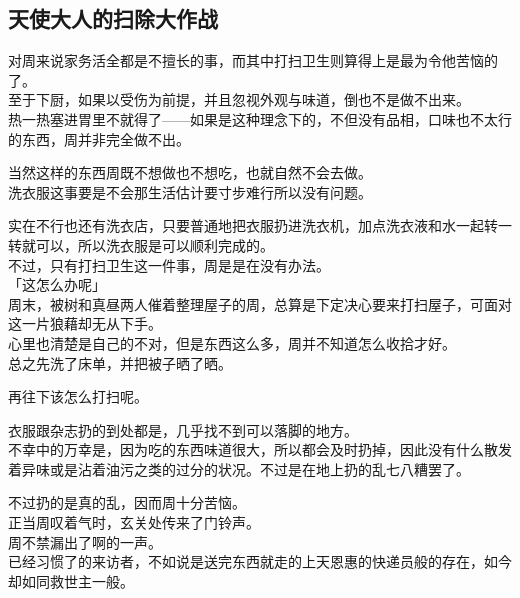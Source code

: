 \subsection{天使大人的扫除大作战}

对周来说家务活全都是不擅长的事，而其中打扫卫生则算得上是最为令他苦恼的了。\\

至于下厨，如果以受伤为前提，并且忽视外观与味道，倒也不是做不出来。\\

热一热塞进胃里不就得了——如果是这种理念下的，不但没有品相，口味也不太行的东西，周并非完全做不出。

当然这样的东西周既不想做也不想吃，也就自然不会去做。\\

洗衣服这事要是不会那生活估计要寸步难行所以没有问题。

实在不行也还有洗衣店，只要普通地把衣服扔进洗衣机，加点洗衣液和水一起转一转就可以，所以洗衣服是可以顺利完成的。\\

不过，只有打扫卫生这一件事，周是是在没有办法。\\

「这怎么办呢」\\

周末，被树和真昼两人催着整理屋子的周，总算是下定决心要来打扫屋子，可面对这一片狼藉却无从下手。\\

心里也清楚是自己的不对，但是东西这么多，周并不知道怎么收拾才好。\\

总之先洗了床单，并把被子晒了晒。

再往下该怎么打扫呢。

衣服跟杂志扔的到处都是，几乎找不到可以落脚的地方。\\

不幸中的万幸是，因为吃的东西味道很大，所以都会及时扔掉，因此没有什么散发着异味或是沾着油污之类的过分的状况。不过是在地上扔的乱七八糟罢了。

不过扔的是真的乱，因而周十分苦恼。\\

正当周叹着气时，玄关处传来了门铃声。\\

周不禁漏出了啊的一声。\\

已经习惯了的来访者，不如说是送完东西就走的上天恩惠的快递员般的存在，如今却如同救世主一般。\\


